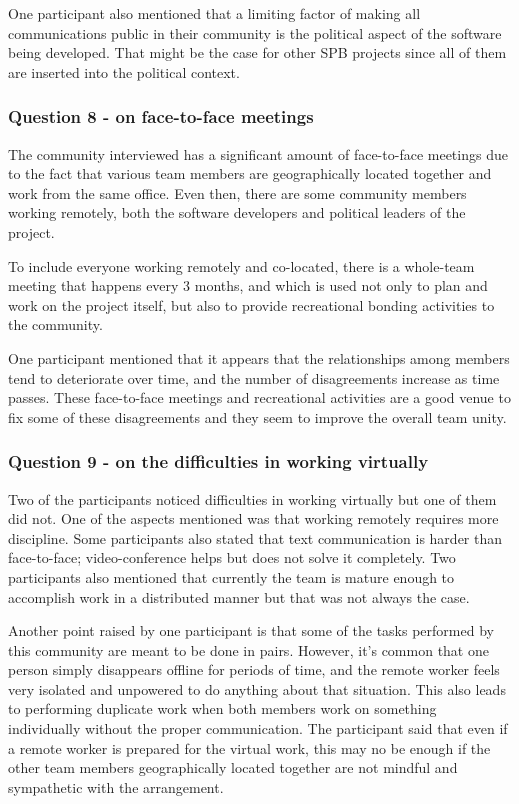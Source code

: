 \documentclass{sigchi}
\begin{document}
One participant also mentioned that a limiting factor of making all communications public in their community is the political aspect of the software being developed. That might be the case for other SPB projects since all of them are inserted into the political context.

\subsubsection{Question 8 - on face-to-face meetings}

The community interviewed has a significant amount of face-to-face meetings due to the fact that various team members are geographically located together and work from the same office. Even then, there are some community members working remotely, both the software developers and political leaders of the project.

To include everyone working remotely and co-located, there is a whole-team meeting that happens every 3 months, and which is used not only to plan and work on the project itself, but also to provide recreational bonding activities to the community. 

One participant mentioned that it appears that the relationships among members tend to deteriorate over time, and the number of disagreements increase as time passes. These face-to-face meetings and recreational activities are a good venue to fix some of these disagreements and they seem to improve the overall team unity.

\subsubsection{Question 9 - on the difficulties in working virtually}

Two of the participants noticed difficulties in working virtually but one of them did not. One of the aspects mentioned was that working remotely requires more discipline. Some participants also stated that text communication is harder than face-to-face; video-conference helps but does not solve it completely. Two participants also mentioned that currently the team is mature enough to accomplish work in a distributed manner but that was not always the case. 

Another point raised by one participant is that some of the tasks performed by this community are meant to be done in pairs. However, it's common that one person simply disappears offline for periods of time, and the remote worker feels very isolated and unpowered to do anything about that situation. This also leads to performing duplicate work when both members work on something individually without the proper communication. The participant said that even if a remote worker is prepared for the virtual work, this may no be enough if the other team members geographically located together are not mindful and sympathetic with the arrangement.
\end{document}
